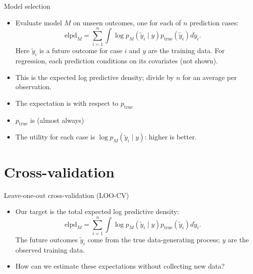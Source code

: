 \documentclass[10pt]{beamer}
\begin{document}
\begin{frame}{Model selection}

\begin{itemize}
\item Evaluate model $M$ on unseen outcomes, one for each of $n$ prediction cases:
\[
\text{elpd}_M=\sum_{i=1}^n\int\log p_M(\tilde y_i\mid y)
  p_\text{true}(\tilde y_i)d\tilde y_i.
\]
Here $\tilde y_i$ is a future outcome for case $i$ and $y$ are the training data.
For regression, each prediction conditions on its covariates (not shown).
\item This is the  expected log predictive density; divide by $n$
  for an average per observation.
\pause
\item The expectation is with respect to $p_\text{true}$
\pause
\item $p_\text{true}$ is (almost always) 
\pause
\item The utility for each case is $\log p_M(\tilde y_i\mid y)$: higher is better.
\end{itemize}
\end{frame}




\section{Cross-validation}
\frame{\sectionpage}

\begin{frame}{Leave-one-out cross-validation (LOO-CV)}
\begin{itemize}
\item Our target is the total expected log predictive density:
\[
\text{elpd}_M=\sum_{i=1}^n\int\log p_M(\tilde y_i\mid y)
  p_\text{true}(\tilde y_i)d\tilde y_i.
\]
The future outcomes $\tilde y_i$ come from the true data-generating process;
$y$ are the observed training data.
\pause
\item How can we estimate these expectations without collecting new data?
\end{itemize}
\end{frame}
\end{document}
